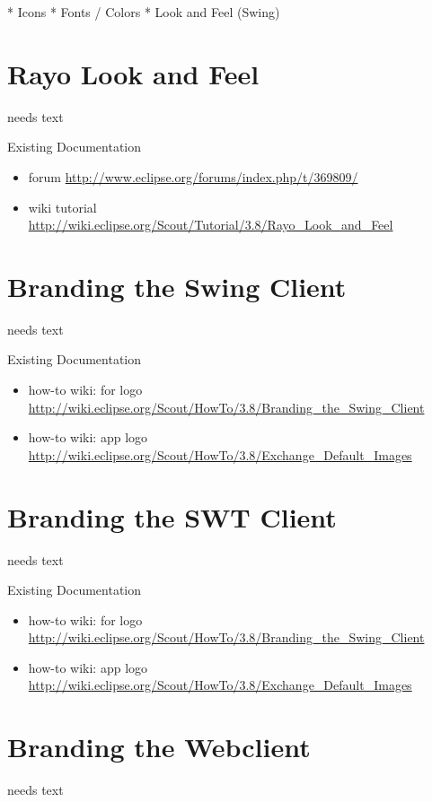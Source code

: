 \documentclass[a4paper,10pt,twoside]{book}
\begin{document}
* Icons
* Fonts / Colors
* Look and Feel (Swing)

\section{Rayo Look and Feel}
needs text

\noindent Existing Documentation
\begin{itemize}
  \item forum \url{http://www.eclipse.org/forums/index.php/t/369809/}
  \item wiki tutorial \url{http://wiki.eclipse.org/Scout/Tutorial/3.8/Rayo_Look_and_Feel}
\end{itemize}

\section{Branding the Swing Client}
needs text

\noindent Existing Documentation
\begin{itemize}
  \item how-to wiki: for logo \url{http://wiki.eclipse.org/Scout/HowTo/3.8/Branding_the_Swing_Client}
  \item how-to wiki: app logo \url{http://wiki.eclipse.org/Scout/HowTo/3.8/Exchange_Default_Images}
\end{itemize}

\section{Branding the SWT Client}
needs text

\noindent Existing Documentation
\begin{itemize}
  \item how-to wiki: for logo \url{http://wiki.eclipse.org/Scout/HowTo/3.8/Branding_the_Swing_Client}
  \item how-to wiki: app logo \url{http://wiki.eclipse.org/Scout/HowTo/3.8/Exchange_Default_Images}
\end{itemize}

\section{Branding the Webclient}
needs text
\end{document}
